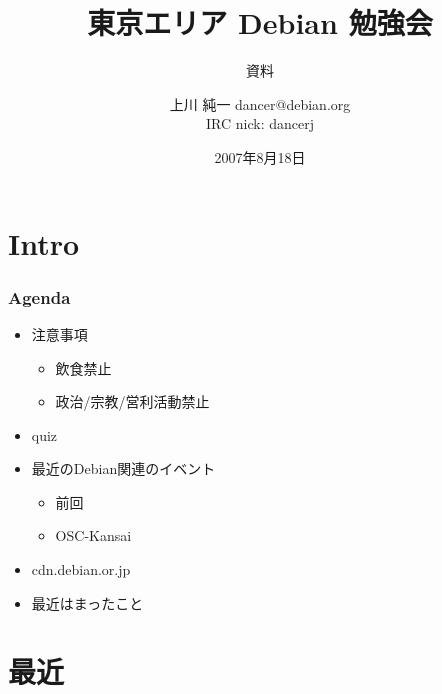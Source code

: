 \documentclass[cjk,dvipdfmx,12pt]{beamer}
\title{東京エリア Debian 勉強会}
\subtitle{資料}
\author{上川 純一 dancer@debian.org\\IRC nick: dancerj}
\date{2007年8月18日}
\begin{document}
\frame{\titlepage{}}

\section{Intro}

\begin{frame}
 \frametitle{Agenda}
\begin{minipage}[t]{0.45\hsize}
  \begin{itemize}
  \item 注意事項
	\begin{itemize}
	 \item 飲食禁止
	 \item 政治/宗教/営利活動禁止
	\end{itemize}
  \item quiz
  \item 最近のDebian関連のイベント
	\begin{itemize}
	 \item 前回
	 \item OSC-Kansai
	\end{itemize}
 \end{itemize}
\end{minipage} 
\begin{minipage}[t]{0.45\hsize}
 \begin{itemize}
  \item cdn.debian.or.jp
  \item 最近はまったこと
 \end{itemize}
\end{minipage}
\end{frame}

\section{最近}
\end{document}
